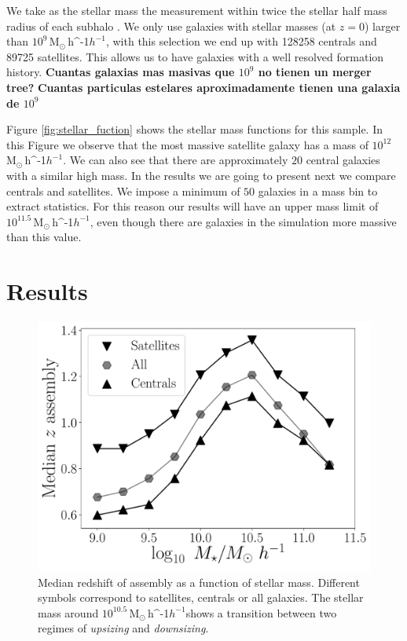 \documentclass[a4paper,fleqn,usenatbib]{mnras}
\newcommand{\Msunh}{\,{\rm M}$_{\odot}$\,\ifmmode h^{-1}\else $h^{-1}$\fi}
\begin{document}
We take as the stellar mass the measurement within
twice the stellar half mass radius of each subhalo
\citep{2018MNRAS.475..676S}.
We only use galaxies with stellar masses (at $z=0$) larger than
$10^{9}$\Msunh,  
with this selection we end up with 128258 centrals and 89725
satellites.
This allows us to have galaxies with a well resolved formation
history. 
\textbf{Cuantas galaxias mas masivas que $10^9$ no tienen un merger
  tree?} 
\textbf{Cuantas particulas estelares aproximadamente tienen una
  galaxia de $10^9$ }


Figure \ref{fig:stellar_fuction} shows the stellar mass functions for
this sample.
In this Figure we observe that the most massive satellite galaxy has a
mass of $10^{12}$\Msunh.  
We can also see that there are approximately $20$ central galaxies
with a similar high mass. 
In the results we are going to present next we compare centrals and
satellites. 
We impose a  minimum of $50$ galaxies in a mass bin to extract statistics. 
For this reason our results will have an upper mass limit of
$10^{11.5}$\Msunh, even though there are galaxies in the simulation
more massive than this value.




\section{Results}
\label{sec:galactic_prop}



\begin{figure}
    \centering
    \includegraphics[width=1\columnwidth]{figuras/median_assembly.pdf}
    \caption{Median redshift of assembly as a function of stellar mass.
    Different symbols correspond to satellites, centrals or all galaxies.
    The stellar mass around $10^{10.5}$\Msunh shows a transition between two 
    regimes of \emph{upsizing} and \emph{downsizing}.}
    \label{fig:median_assembly}
\end{figure}
\end{document}
